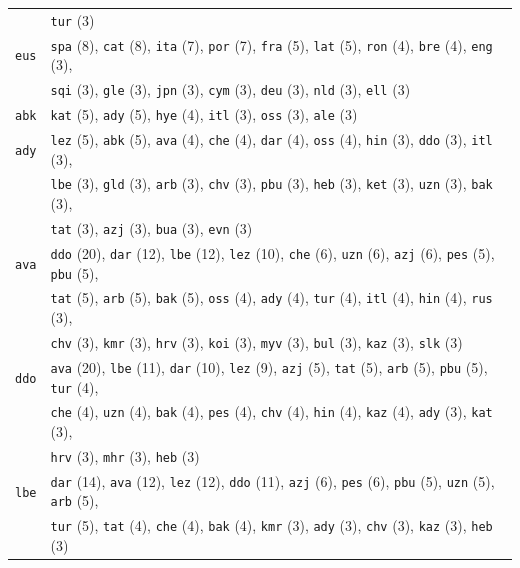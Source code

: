 \begin{center}
\begin{longtable}{ll}
 & \texttt{tur} (3) \\
\texttt{eus} & \texttt{spa} (8), \texttt{cat} (8), \texttt{ita} (7), \texttt{por} (7), \texttt{fra} (5), \texttt{lat} (5), \texttt{ron} (4), \texttt{bre} (4), \texttt{eng} (3), \\
 & \texttt{sqi} (3), \texttt{gle} (3), \texttt{jpn} (3), \texttt{cym} (3), \texttt{deu} (3), \texttt{nld} (3), \texttt{ell} (3) \\
\texttt{abk} & \texttt{kat} (5), \texttt{ady} (5), \texttt{hye} (4), \texttt{itl} (3), \texttt{oss} (3), \texttt{ale} (3) \\
\texttt{ady} & \texttt{lez} (5), \texttt{abk} (5), \texttt{ava} (4), \texttt{che} (4), \texttt{dar} (4), \texttt{oss} (4), \texttt{hin} (3), \texttt{ddo} (3), \texttt{itl} (3), \\
 & \texttt{lbe} (3), \texttt{gld} (3), \texttt{arb} (3), \texttt{chv} (3), \texttt{pbu} (3), \texttt{heb} (3), \texttt{ket} (3), \texttt{uzn} (3), \texttt{bak} (3), \\
 & \texttt{tat} (3), \texttt{azj} (3), \texttt{bua} (3), \texttt{evn} (3) \\
\texttt{ava} & \texttt{ddo} (20), \texttt{dar} (12), \texttt{lbe} (12), \texttt{lez} (10), \texttt{che} (6), \texttt{uzn} (6), \texttt{azj} (6), \texttt{pes} (5), \texttt{pbu} (5), \\
 & \texttt{tat} (5), \texttt{arb} (5), \texttt{bak} (5), \texttt{oss} (4), \texttt{ady} (4), \texttt{tur} (4), \texttt{itl} (4), \texttt{hin} (4), \texttt{rus} (3), \\
 & \texttt{chv} (3), \texttt{kmr} (3), \texttt{hrv} (3), \texttt{koi} (3), \texttt{myv} (3), \texttt{bul} (3), \texttt{kaz} (3), \texttt{slk} (3) \\
\texttt{ddo} & \texttt{ava} (20), \texttt{lbe} (11), \texttt{dar} (10), \texttt{lez} (9), \texttt{azj} (5), \texttt{tat} (5), \texttt{arb} (5), \texttt{pbu} (5), \texttt{tur} (4), \\
 & \texttt{che} (4), \texttt{uzn} (4), \texttt{bak} (4), \texttt{pes} (4), \texttt{chv} (4), \texttt{hin} (4), \texttt{kaz} (4), \texttt{ady} (3), \texttt{kat} (3), \\
 & \texttt{hrv} (3), \texttt{mhr} (3), \texttt{heb} (3) \\
\texttt{lbe} & \texttt{dar} (14), \texttt{ava} (12), \texttt{lez} (12), \texttt{ddo} (11), \texttt{azj} (6), \texttt{pes} (6), \texttt{pbu} (5), \texttt{uzn} (5), \texttt{arb} (5), \\
 & \texttt{tur} (5), \texttt{tat} (4), \texttt{che} (4), \texttt{bak} (4), \texttt{kmr} (3), \texttt{ady} (3), \texttt{chv} (3), \texttt{kaz} (3), \texttt{heb} (3) \\

\end{longtable}
\end{center}

